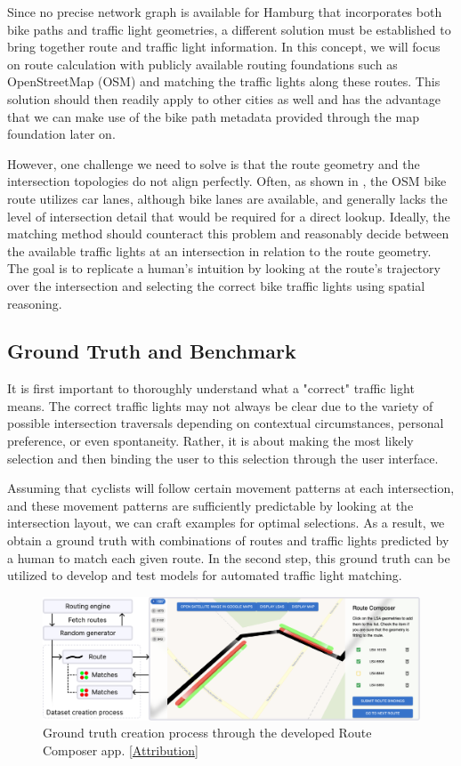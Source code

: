 Since no precise network graph is available for Hamburg that incorporates both bike paths and traffic light geometries, a different solution must be established to bring together route and traffic light information. In this concept, we will focus on route calculation with publicly available routing foundations such as OpenStreetMap (OSM) and matching the traffic lights along these routes. This solution should then readily apply to other cities as well and has the advantage that we can make use of the bike path metadata provided through the map foundation later on.

However, one challenge we need to solve is that the route geometry and the intersection topologies do not align perfectly. Often, as shown in , the OSM bike route utilizes car lanes, although bike lanes are available, and generally lacks the level of intersection detail that would be required for a direct lookup. Ideally, the matching method should counteract this problem and reasonably decide between the available traffic lights at an intersection in relation to the route geometry. The goal is to replicate a human's intuition by looking at the route's trajectory over the intersection and selecting the correct bike traffic lights using spatial reasoning.

\subsection{Ground Truth and Benchmark}

It is first important to thoroughly understand what a "correct" traffic light means. The correct traffic lights may not always be clear due to the variety of possible intersection traversals depending on contextual circumstances, personal preference, or even spontaneity. Rather, it is about making the most likely selection and then binding the user to this selection through the user interface.

Assuming that cyclists will follow certain movement patterns at each intersection, and these movement patterns are sufficiently predictable by looking at the intersection layout, we can craft examples for optimal selections. As a result, we obtain a ground truth with combinations of routes and traffic lights predicted by a human to match each given route. In the second step, this ground truth can be utilized to develop and test models for automated traffic light matching.

\begin{figure}[t]
\centering
\includegraphics[width=\linewidth]{images/sg-selection-ground-truth.pdf}
\caption{Ground truth creation process through the developed Route Composer app. [\hyperref[attribution]{Attribution}]}
\label{fig:sg-selection-ground-truth}
\end{figure}

